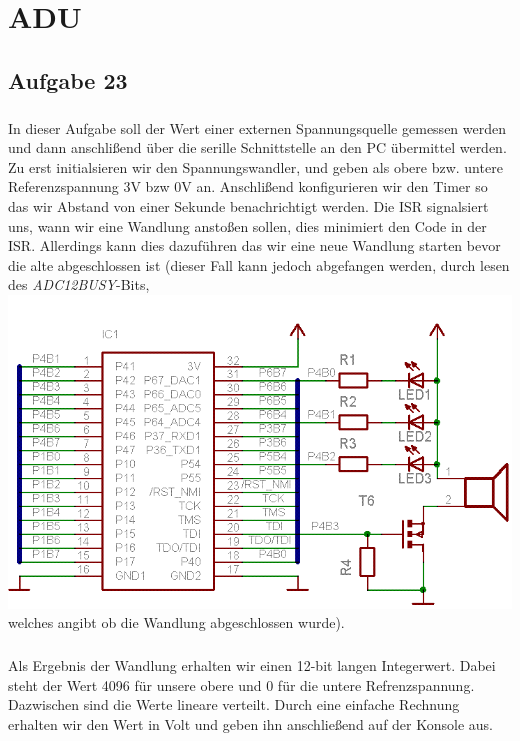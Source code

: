 \chapter{ADU}

\section{Aufgabe 23}

\paragraph*{}
In dieser Aufgabe soll der Wert einer externen Spannungsquelle gemessen werden und dann anschlißend über die serille Schnittstelle an den PC übermittel werden. Zu erst initialsieren wir den Spannungswandler, und geben als obere bzw. untere Referenzspannung 3V bzw 0V an. Anschlißend konfigurieren wir den Timer so das wir Abstand von einer Sekunde benachrichtigt werden. Die ISR signalsiert uns, wann wir eine Wandlung anstoßen sollen, dies minimiert den Code in der ISR. Allerdings kann dies dazuführen das wir eine neue Wandlung starten bevor die alte abgeschlossen ist (dieser Fall kann jedoch abgefangen werden, durch lesen des {\em ADC12BUSY}-Bits,\includegraphics[width=\textwidth]{img/mikrocontrollerUNDled.png} welches angibt ob die Wandlung abgeschlossen wurde).



\paragraph*{}
Als Ergebnis der Wandlung erhalten wir einen 12-bit langen Integerwert. Dabei steht der Wert 4096 für unsere obere und 0 für die untere Refrenzspannung. Dazwischen sind die Werte lineare verteilt. Durch eine einfache Rechnung erhalten wir den Wert in Volt und geben ihn anschließend auf der Konsole aus.

